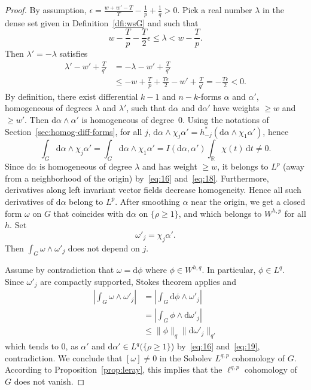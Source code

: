 \documentclass[11pt]{article}
\theoremstyle{definition}
\numberwithin{equation}{section}
\numberwithin{figure}{section}
\numberwithin{table}{section}
\newcommand{\R}{\mathbb{R}}
\newcommand{\dd}{\mathrm{d}}
\newcommand{\dt}{\dd t}
\newcommand{\dphi}{\dd \phi}
\newcommand{\dalpha}{\dd \alpha}
\newcommand{\domega}{\dd \omega}
\begin{document}
\begin{proof}
By assumption, $\epsilon=\frac{w+w'-T}{T}-\frac{1}{p}+\frac{1}{q}>0$. Pick a real number $\lambda$ in the dense set given in Definition~\ref{dfi:wsG} and such that
\begin{equation}\label{eq:18}
w-\frac{T}{p}-\frac{T}{2}\epsilon \leq \lambda < w-\frac{T}{p}.
\end{equation}
Then $\lambda'=-\lambda$ satisfies
\begin{align}
\lambda'-w'+\frac{T}{q'} & = -\lambda - w' + \frac{T}{q'} \nonumber \\
& \leq -w + \frac{T}{p} + \frac{T\epsilon}{2} -w' + \frac{T}{q'} = - \frac{T\epsilon}{2} < 0. \label{eq:19}
\end{align}
By definition, there exist differential $k-1$ and $n-k$-forms $\alpha$ and $\alpha'$, homogeneous of degrees $\lambda$ and $\lambda'$, such that $\dalpha$ and $\dalpha'$ have weights $\geq w$ and $\geq w'$. Then $\dalpha \wedge \alpha'$ is homogeneous of degree~$0$. Using the notations of Section~\ref{sec:homog-diff-forms}, for all $j$, $\dalpha\wedge \chi_j\alpha'= h_{-j}^*(\dalpha\wedge \chi_1
\alpha')$, hence
\[
\int_{G} \dalpha \wedge \chi_j\alpha'=\int_{G} \dalpha \wedge
\chi_1\alpha'=I(\dalpha,\alpha')\int_{\R}\chi(t)\,\dt\not=0.
\]
Since $\dalpha$ is homogeneous of degree $\lambda$ and has weight $\geq w$, it belongs to $L^p$ (away from a neighborhood of the origin) by~\eqref{eq:16} and~\eqref{eq:18}. Furthermore, derivatives along left invariant vector fields decrease homogeneity. Hence all such derivatives of $\dalpha$ belong to $L^p$. After smoothing $\alpha$ near the origin, we get a closed form $\omega$ on $G$ that coincides with $\dalpha$ on $\{\rho \geq 1\}$, and which belongs to $W^{h,p}$ for all $h$. Set
\[
\omega'_j=\chi_j \alpha'.
\]
Then $\int_{G}\omega\wedge \omega'_j$ does not depend on $j$.

Assume by contradiction that $\omega=\dphi$ where $\phi\in W^{h,q}$. In particular, $\phi\in L^q$. Since $\omega'_j$ are compactly supported, Stokes theorem applies and
\begin{align*}
\left|\int_{G}\omega\wedge \omega'_j\right| &=\left|\int_{G}\dphi\wedge \omega'_j\right|\\
&=\left|\int_{G}\phi\wedge \domega'_j\right|\\
&\leq\|\phi\|_{q}\|\domega'_j\|_{q'}
\end{align*}
which tends to $0$, as $\alpha'$ and $\dalpha' \in L^q(\{\rho \geq 1\}$) by~\eqref{eq:16} and~\eqref{eq:19}, contradiction. We conclude that $[\omega]\not=0$ in the Sobolev $L^{q,p}$ cohomology of $G$. According to Proposition~\ref{prop:leray}, this implies that the $\ell^{q,p}$ cohomology of $G$ does not vanish.
\end{proof}
\end{document}
